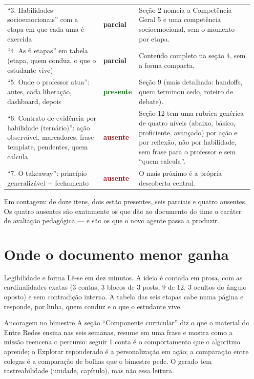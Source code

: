 \documentclass[11pt,a4paper]{article}
\newcommand{\presente}{\textcolor{DarkGreen}{\textbf{presente}}}
\newcommand{\parcial}{\textcolor{DarkYellow}{\textbf{parcial}}}
\newcommand{\ausente}{\textcolor{DarkRed}{\textbf{ausente}}}
\begin{document}
\begin{small}
\begin{longtable}{@{}p{} p{} p{}@{}}
``3. Habilidades socioemocionais'' com a etapa em que cada uma é exercida & \parcial & Seção 2 nomeia a Competência Geral 5 e uma competência socioemocional, sem o momento por etapa. \\
``4. As 6 etapas'' em tabela (etapa, quem conduz, o que o estudante vive) & \parcial & Conteúdo completo na seção 4, sem a forma compacta. \\
``5. Onde o professor atua'': antes, cada liberação, dashboard, depois & \presente & Seção 9 (mais detalhada: handoffs, quem terminou cedo, roteiro de debate). \\
``6. Contrato de evidência por habilidade (ternário)'': ação observável, marcadores, frase-template, pendentes, quem calcula & \ausente & Seção 12 tem uma rubrica genérica de quatro níveis (abaixo, básico, proficiente, avançado) por ação e por reflexão, não por habilidade, sem frase para o professor e sem ``quem calcula''. \\
``7. O takeaway'': princípio generalizável + fechamento & \ausente & O mais próximo é a própria descoberta central. \\
\bottomrule
\end{longtable}
\end{small}

\noindent Em contagem: de doze itens, dois estão presentes, seis parciais e quatro ausentes. Os quatro ausentes são exatamente os que dão ao documento do time o caráter de avaliação pedagógica --- e são os que o novo agente passa a produzir.

\section{Onde o documento menor ganha}

\begin{creditobox}{Legibilidade e forma}
Lê-se em dez minutos. A ideia é contada em prosa, com as cardinalidades exatas (3 contas, 3 blocos de 3 posts, 9 de 12, 3 ocultos do ângulo oposto) e sem contradição interna. A tabela das seis etapas cabe numa página e responde, por linha, quem conduz e o que o estudante vive.
\end{creditobox}

\begin{creditobox}{Ancoragem no bimestre}
A seção ``Componente curricular'' diz o que o material do Entre Redes ensina nas seis semanas, resume em uma frase e mostra como a missão reencena o percurso: seguir 1 conta é o comportamento que o algoritmo aprende; o Explorar reponderado é a personalização em ação; a comparação entre colegas é a comparação de bolhas que o bimestre pede. O gerado tem rastreabilidade (unidade, capítulo), mas não essa leitura.
\end{creditobox}
\end{document}
